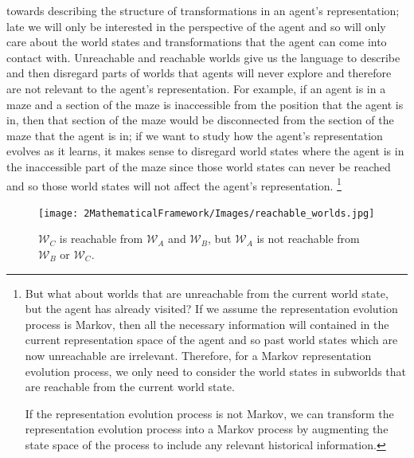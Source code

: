  towards describing the structure of transformations in an agent's representation; late we will only be interested in the perspective of the agent and so will only care about the world states and transformations that the agent can come into contact with.
Unreachable and reachable worlds give us the language to describe and then disregard parts of worlds that agents will never explore and therefore are not relevant to the agent's representation.
For example, if an agent is in a maze and a section of the maze is inaccessible from the position that the agent is in, then that section of the maze would be disconnected from the section of the maze that the agent is in; if we want to study how the agent’s representation evolves as it learns, it makes sense to disregard world states where the agent is in the inaccessible part of the maze since those world states can never be reached and so those world states will not affect the agent's representation.
\footnote{
	But what about worlds that are unreachable from the current world state, but the agent has already visited?
	If we assume the representation evolution process is Markov, then all the necessary information will contained in the current representation space of the agent and so past world states which are now unreachable are irrelevant.
	Therefore, for a Markov representation evolution process, we only need to consider the world states in subworlds that are reachable from the current world state.

	If the representation evolution process is not Markov, we can transform the representation evolution process into a Markov process by augmenting the state space of the process to include any relevant historical information.
}
\begin{figure}
	\centering
	\texttt{[image: 2MathematicalFramework/Images/reachable\_worlds.jpg]}
	\caption{
		$\mathscr{W}_{C}$ is reachable from $\mathscr{W}_{A}$ and $\mathscr{W}_{B}$, but $\mathscr{W}_{A}$ is not reachable from $\mathscr{W}_{B}$ or $\mathscr{W}_{C}$.
	}
	\label{fig:reachable_worlds}
\end{figure}


